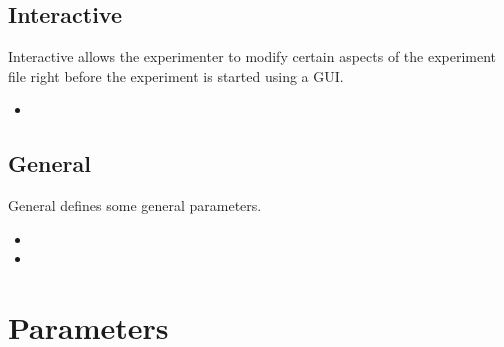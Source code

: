 \subsection{Interactive}

\label{sec:Interactive}

Interactive allows the experimenter to modify certain aspects of
the experiment file right before the experiment is started using a
GUI.


\begin{itemize}
\item {}
\end{itemize}


\subsection{General}
General defines some general parameters.

\label{sec:General}
\begin{itemize}
\item {}

\item {}
\end{itemize}

\section{Parameters}

